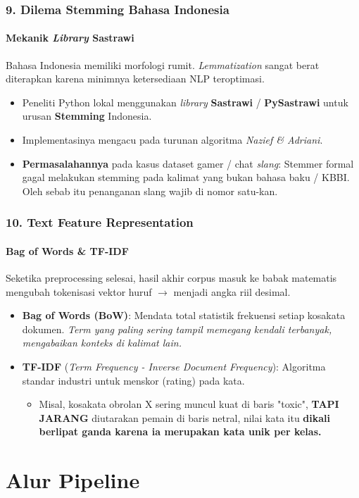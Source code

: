 \documentclass[t,aspectratio=169,xcolor=dvipsnames]{beamer}
\begin{document}
\begin{frame}
    \frametitle{9. Dilema Stemming Bahasa Indonesia}
    \framesubtitle{Mekanik \textit{Library} Sastrawi}
    \small
    Bahasa Indonesia memiliki morfologi rumit. \textit{Lemmatization} sangat berat diterapkan karena minimnya ketersediaan NLP teroptimasi.
    \vspace{0.2cm}
    \begin{itemize}
        \item Peneliti Python lokal menggunakan \textit{library} \textbf{Sastrawi} / \textbf{PySastrawi} untuk urusan \textbf{Stemming} Indonesia.
        \item Implementasinya mengacu pada turunan algoritma \textit{Nazief \& Adriani}.
        \item \textbf{Permasalahannya} pada kasus dataset gamer / chat \textit{slang}: Stemmer formal gagal melakukan stemming pada kalimat yang bukan bahasa baku / KBBI. Oleh sebab itu penanganan slang wajib di nomor satu-kan.
    \end{itemize}
\end{frame}

\begin{frame}
    \frametitle{10. Text Feature Representation}
    \framesubtitle{Bag of Words \& TF-IDF}
    \small
    Seketika preprocessing selesai, hasil akhir corpus masuk ke babak matematis mengubah tokenisasi vektor huruf $\rightarrow$ menjadi angka riil desimal.
    \vspace{0.2cm}
    \begin{itemize}
        \item \textbf{Bag of Words (BoW)}: Mendata total statistik frekuensi setiap kosakata dokumen. \textit{Term yang paling sering tampil memegang kendali terbanyak, mengabaikan konteks di kalimat lain.}
        \item \textbf{TF-IDF} (\textit{Term Frequency - Inverse Document Frequency}): 
        Algoritma standar industri untuk menskor (rating) pada kata.
        \begin{itemize}
            \item Misal, kosakata obrolan X sering muncul kuat di baris "toxic", \textbf{TAPI JARANG} diutarakan pemain di baris netral, nilai kata itu \textbf{dikali berlipat ganda karena ia merupakan kata unik per kelas.}
        \end{itemize}
    \end{itemize}
\end{frame}

\section{Alur Pipeline}
\end{document}
